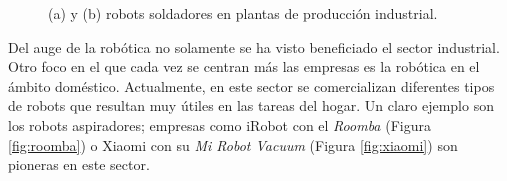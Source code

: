 \begin{figure}
	\begin{center}
		\hspace{0.1cm}
	\end{center}	
	\centering
	\captionsetup{justification=centering,margin=0.1cm}
	\caption{(a) y (b) robots soldadores en plantas de producción industrial.}
	\label{fig:robots2}
\end{figure}

Del auge de la robótica no solamente se ha visto beneficiado el sector industrial. Otro foco en el que cada vez se centran más las empresas es la robótica en el ámbito doméstico. Actualmente, en este sector se comercializan diferentes tipos de robots que resultan muy útiles en las tareas del hogar. Un claro ejemplo son los robots aspiradores; empresas como iRobot con el \textit{Roomba} (Figura \ref{fig:roomba}) o Xiaomi con su \textit{Mi Robot Vacuum} (Figura \ref{fig:xiaomi}) son pioneras en este sector.

